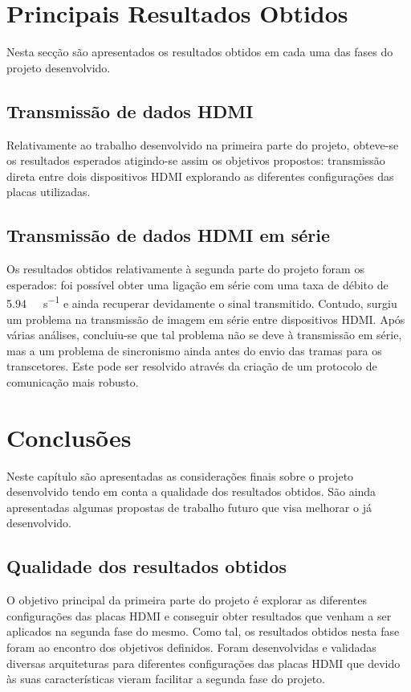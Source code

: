\documentclass[a4paper]{IEEEtran}
\begin{document}
\section{Principais Resultados Obtidos}
Nesta secção são apresentados os resultados obtidos em cada uma das fases do projeto desenvolvido.
\subsection{Transmissão de dados HDMI}
Relativamente ao trabalho desenvolvido na primeira parte do projeto, obteve-se os resultados esperados atigindo-se assim os objetivos propostos: transmissão direta entre dois dispositivos HDMI explorando as diferentes configurações das placas utilizadas.

\subsection{Transmissão de dados HDMI em série}
Os resultados obtidos relativamente à segunda parte do projeto foram os esperados: foi possível obter uma ligação em série com uma taxa de débito de \SI{5.94}{\giga\bit\per\second} e ainda recuperar devidamente o sinal transmitido. Contudo, surgiu um problema na transmissão de imagem em série entre dispositivos HDMI. Após várias análises, concluiu-se que tal problema não se deve à transmissão em série, mas a um problema de sincronismo ainda antes do envio das tramas para os transcetores. Este pode ser resolvido através da criação de um protocolo de comunicação mais robusto.

\section{Conclusões}

Neste capítulo são apresentadas as considerações finais sobre o projeto desenvolvido tendo em conta a qualidade dos resultados obtidos. São ainda apresentadas algumas propostas de trabalho futuro que visa melhorar o já desenvolvido.

\subsection{Qualidade dos resultados obtidos}

O objetivo principal da primeira parte do projeto é explorar as diferentes configurações das placas HDMI e conseguir obter resultados que venham a ser aplicados na segunda fase do mesmo. Como tal, os resultados obtidos nesta fase foram ao encontro dos objetivos definidos. Foram desenvolvidas e validadas diversas arquiteturas para diferentes configurações das placas HDMI que devido às suas características vieram facilitar a segunda fase do projeto.
\end{document}
